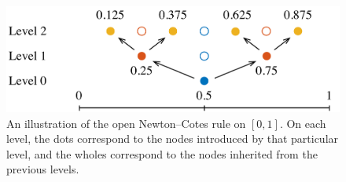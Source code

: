 \begin{figure}[t]
  \centering
  \includegraphics[width=1.0\columnwidth]{include/assets/figures/rule.pdf}
  \caption{
    An illustration of the open Newton--Cotes rule on $[0, 1]$. On each level,
    the dots correspond to the nodes introduced by that particular level, and
    the wholes correspond to the nodes inherited from the previous levels.
  }
\end{figure}
